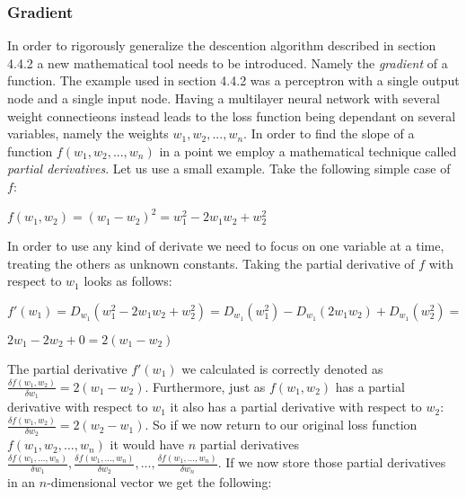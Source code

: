 \documentclass[titlepage]{article}
\begin{document}
\newpage

\subsubsection{Gradient}

\vskip 0.2cm

In order to rigorously generalize the descention algorithm described in section 4.4.2 a new mathematical tool needs to be introduced. Namely the \emph{gradient} of a function. The example used in section 4.4.2 was a perceptron with a single output node and a single input node. Having a multilayer neural network with several weight connectieons instead leads to the loss function being dependant on several variables, namely the weights $w_{1}, w_{2}, ..., w_{n}$. In order to find the slope of a function $f(w_{1}, w_{2}, ..., w_{n})$ in a point we employ a mathematical technique called \emph{partial derivatives}. Let us use a small example. Take the following simple case of $f$: 

\vskip 0.5cm

\centerline{$f(w_{1}, w_{2}) = (w_{1} - w_{2})^2 = w_{1}^2 - 2w_{1}w_{2} + w_{2}^2$}

\vskip 0.5cm

\noindent
In order to use any kind of derivate we need to focus on one variable at a time, treating the others as unknown constants. Taking the partial derivative of $f$ with respect to $w_{1}$ looks as follows:

\vskip 0.3cm

\centerline{$f'(w_{1}) = D_{w_{1}}(w_{1}^2 - 2w_{1}w_{2} + w_{2}^2) = D_{w_{1}}(w_{1}^2) - D_{w_{1}}(2w_{1}w_{2}) + D_{w_{1}}(w_{2}^2) =$}

\vskip 0.3cm

\centerline{$2w_{1} - 2w_{2} + 0 = 2(w_{1} - w_{2})$}

\vskip 0.3cm

\noindent
The partial derivative $f'(w_{1})$ we calculated is correctly denoted as $\frac{\delta f(w_{1}, w_{2})}{\delta w_{1}} = 2(w_{1} - w_{2})$. Furthermore, just as $f(w_{1}, w_{2})$ has a partial derivative with respect to $w_{1}$ it also has a partial derivative with respect to $w_{2}$: $\frac{\delta f(w_{1}, w_{2})}{\delta w_{2}} = 2(w_{2} - w_{1})$. So if we now return to our original loss function $f(w_{1}, w_{2}, ..., w_{n})$ it would have $n$ partial derivatives $\frac{\delta f(w_{1}, ..., w_{n})}{\delta w_{1}}, \frac{\delta f(w_{1}, ..., w_{n})}{\delta w_{2}}, ..., \frac{\delta f(w_{1}, ..., w_{n})}{\delta w_{n}}$. If we now store those partial derivatives in an $n$-dimensional vector we get the following:
\end{document}
